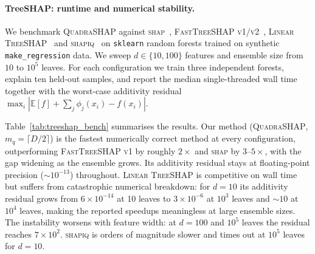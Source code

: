 \documentclass{article}
\begin{document}
\paragraph{TreeSHAP: runtime and numerical stability.}
We benchmark \textsc{QuadraSHAP} against \textsc{shap}~\citep{shap},
\textsc{FastTreeSHAP v1/v2}~\citep{fast_tree_shap}, \textsc{Linear TreeSHAP}~\citep{linear_treeshap, linear_treeshap_repo} and \textsc{shapiq}~\citep{shapiq} on
\texttt{sklearn} random forests trained on synthetic
\texttt{make\_regression} data. We sweep $d \in \{10, 100\}$ features
and ensemble size from $10$ to $10^5$ leaves. For each configuration we
train three independent forests, explain ten held-out samples, and
report the median single-threaded wall time together with the
worst-case additivity residual $\max_i|\mathbb{E}[f]+\sum_j\phi_j(x_i)-f(x_i)|$.

Table~\ref{tab:treeshap_bench} summarises the results.
Our method (\textsc{QuadraSHAP}, $m_q{=}\lceil D/2\rceil$) is the fastest
numerically correct method at every configuration, outperforming
\textsc{FastTreeSHAP v1} by roughly $2{\times}$ and \textsc{shap} by
$3$--$5{\times}$, with the gap widening as the ensemble grows.
Its additivity residual stays at floating-point precision (${\sim}10^{-13}$)
throughout.
\textsc{Linear TreeSHAP} is competitive on wall time but suffers from
catastrophic numerical breakdown: for $d{=}10$ its additivity residual
grows from $6{\times}10^{-14}$ at 10 leaves to $3{\times}10^{-6}$ at $10^3$
leaves and ${\sim}10$ at $10^4$ leaves, making the reported speedups
meaningless at large ensemble sizes.
The instability worsens with feature width: at $d{=}100$ and $10^5$
leaves the residual reaches $7{\times}10^2$.
\textsc{shapiq} is orders of magnitude slower and times out at $10^5$
leaves for $d{=}10$.
\end{document}

